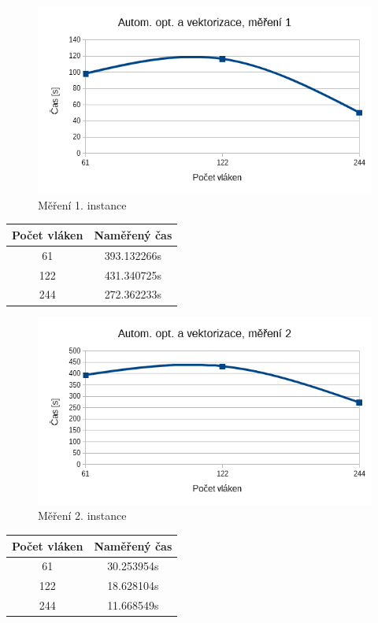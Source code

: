 \documentclass[12pt]{article}
\begin{document}
\begin{figure}[H]
  \begin{center}
      \includegraphics[width=12cm]{images/phi1.png}	
    \caption{Měření 1. instance} 
  \end{center}
\end{figure}
%
%
\begin{center}
\begin{tabular}{ c | c }
\textbf{Počet vláken} & \textbf{Naměřený čas} \\ \hline \hline 
61 & 393.132266s \\ \hline
122 & 431.340725s \\ \hline
244 & 272.362233s \\ \hline
\end{tabular}
\end{center}

\begin{figure}[H]
  \begin{center}
      \includegraphics[width=12cm]{images/phi2.png}	
    \caption{Měření 2. instance} 
  \end{center}
\end{figure}
%
%
\begin{center}
\begin{tabular}{ c | c }
\textbf{Počet vláken} & \textbf{Naměřený čas} \\ \hline \hline 
61 & 30.253954s \\ \hline
122 & 18.628104s \\ \hline
244 & 11.668549s \\ \hline
\end{tabular}
\end{center}
\end{document}
